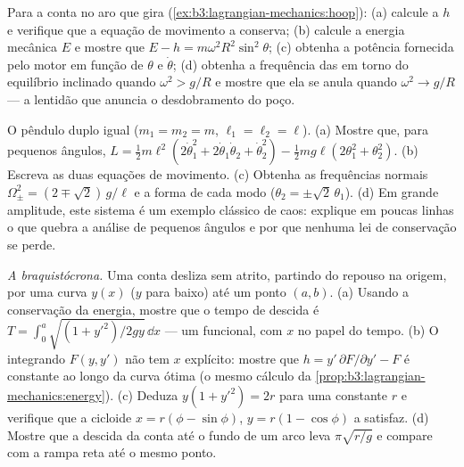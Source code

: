 \begin{exercise}[$\star\star$]\label{exo:b3:lagrangian-mechanics:9}
Para a conta no aro que gira
(\cref{ex:b3:lagrangian-mechanics:hoop}): (a) calcule a 
$h$ e verifique que a equação de movimento a conserva; (b) calcule a
energia mecânica $E$ e mostre que $E - h =
m\omega^2R^2\sin^2\theta$; (c) obtenha a potência fornecida pelo motor
em função de $\theta$ e $\dot\theta$; (d) obtenha a frequência das
 em torno do equilíbrio inclinado quando
$\omega^2 > g/R$ e mostre que ela se anula quando $\omega^2 \to g/R$
--- a lentidão que anuncia o desdobramento do poço.
\end{exercise}

\begin{exercise}[$\star\star\star$]\label{exo:b3:lagrangian-mechanics:10}
O pêndulo duplo igual ($m_1 = m_2 = m$, $\ell_1 = \ell_2 = \ell$). (a)
Mostre que, para pequenos ângulos, $L = \tfrac12 m\ell^2(2\dot\theta_1^2 +
2\dot\theta_1\dot\theta_2 + \dot\theta_2^2) - \tfrac12 mg\ell(2
\theta_1^2 + \theta_2^2)$. (b) Escreva as duas equações de movimento.
(c) Obtenha as frequências normais
$\Omega_\pm^2 = (2 \mp \sqrt2)\,g/\ell$ e a forma de cada modo
($\theta_2 = \pm\sqrt2\,\theta_1$). (d) Em grande amplitude, este
sistema é um exemplo clássico de caos: explique em poucas linhas o que
quebra a análise de pequenos ângulos e por que nenhuma lei de
conservação se perde.
\end{exercise}

\begin{exercise}[$\star\star\star$]\label{exo:b3:lagrangian-mechanics:11}
\emph{A braquistócrona.} Uma conta desliza sem atrito, partindo do
repouso na origem, por uma curva $y(x)$ ($y$ para baixo) até um ponto
$(a, b)$. (a) Usando a conservação da energia, mostre que o tempo de
descida é $T =
\int_0^a\sqrt{(1 + y'^2)/2gy}\,\dd x$ --- um funcional, com $x$ no
papel do tempo. (b) O integrando $F(y, y')$ não tem $x$ explícito:
mostre que $h = y'\,\partial F/\partial y' - F$ é constante ao longo da
curva ótima (o mesmo cálculo da
\cref{prop:b3:lagrangian-mechanics:energy}). (c) Deduza $y(1 + y'^2) =
2r$ para uma constante $r$ e verifique que a cicloide $x = r(\phi -
\sin\phi)$, $y = r(1 - \cos\phi)$ a satisfaz. (d) Mostre que a descida
da conta até o fundo de um arco leva $\pi\sqrt{r/g}$ e compare com a
rampa reta até o mesmo ponto.
\end{exercise}

